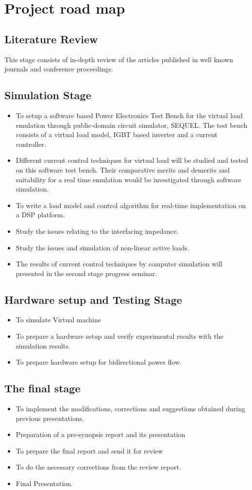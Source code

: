 \chapter{Project road map}
\section{Literature Review}
This stage consists of in-depth review of the articles published in well known journals and conference proceedings.
\section{Simulation Stage}
\begin{itemize}
\item To setup a software based Power Electronics Test Bench for the virtual load emulation through public-domain circuit simulator, SEQUEL. The test bench consists of a virtual load model, IGBT based inverter and a current controller.
\item Different current control techniques for virtual load will be studied and tested on this software test bench. Their comparative merits and demerits and suitability for a real time emulation would be investigated through software simulation.
\item To write a load model and control algorithm for real-time implementation on a DSP platform.
\item Study the issues relating to the interfacing impedance.
\item Study the issues and simulation of non-linear active loads.
\item The results of current control techniques by computer simulation will presented in the second stage progress seminar.
\end{itemize}
\section{Hardware setup and Testing Stage}
\begin{itemize}
\item To simulate Virtual machine
\item To prepare a hardware setup and verify experimental results with the simulation results. 
\item To prepare hardware setup for bidirectional power flow.
\end{itemize}
\section{The final stage}
\begin{itemize}
\item To implement the modifications, corrections and suggestions obtained during previous presentations.
\item Preparation of a pre-synopsis report and its presentation
\item To prepare the final report and send it for review
\item To do the necessary corrections from the review report.
\item Final Presentation.
\end{itemize}
